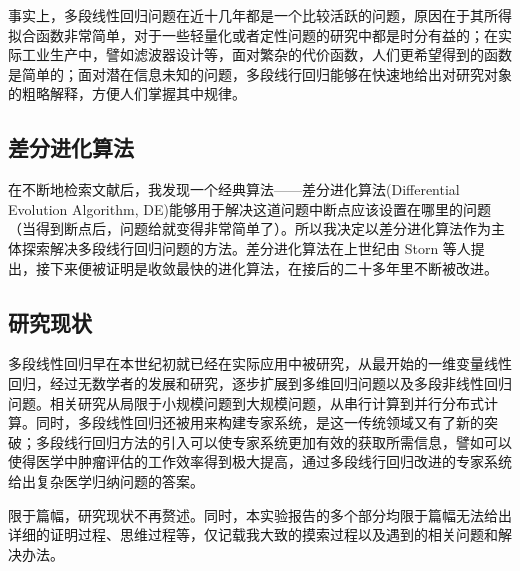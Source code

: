 事实上，多段线性回归问题在近十几年都是一个比较活跃的问题，原因在于其所得拟合函数非常简单，对于一些轻量化或者定性问题的研究中都是时分有益的；在实际工业生产中，譬如滤波器设计等，面对繁杂的代价函数，人们更希望得到的函数是简单的；面对潜在信息未知的问题，多段线行回归能够在快速地给出对研究对象的粗略解释，方便人们掌握其中规律。


\subsection{差分进化算法}

在不断地检索文献后，我发现一个经典算法——差分进化算法(Differential Evolution Algorithm, DE)能够用于解决这道问题中断点应该设置在哪里的问题（当得到断点后，问题给就变得非常简单了）。所以我决定以差分进化算法作为主体探索解决多段线行回归问题的方法。差分进化算法在上世纪由 Storn 等人提出，接下来便被证明是收敛最快的进化算法，在接后的二十多年里不断被改进。


\subsection{研究现状}

多段线性回归早在本世纪初就已经在实际应用中被研究，从最开始的一维变量线性回归，经过无数学者的发展和研究，逐步扩展到多维回归问题以及多段非线性回归问题。相关研究从局限于小规模问题到大规模问题，从串行计算到并行分布式计算。同时，多段线性回归还被用来构建专家系统，是这一传统领域又有了新的突破；多段线行回归方法的引入可以使专家系统更加有效的获取所需信息，譬如可以使得医学中肿瘤评估的工作效率得到极大提高，通过多段线行回归改进的专家系统给出复杂医学归纳问题的答案。

限于篇幅，研究现状不再赘述。同时，本实验报告的多个部分均限于篇幅无法给出详细的证明过程、思维过程等，仅记载我大致的摸索过程以及遇到的相关问题和解决办法。




